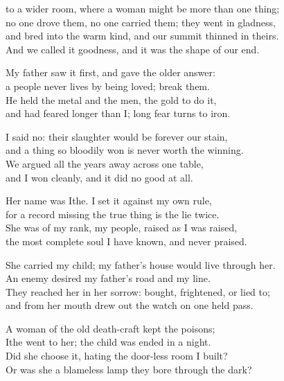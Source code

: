 \begin{founder}
to a wider room, where a woman might be more than one thing;\\
no one drove them, no one carried them; they went in gladness,\\
and bred into the warm kind, and our summit thinned in theirs.\\
And we called it goodness, and it was the shape of our end.\\

\ornament

My father saw it first, and gave the older answer:\\
a people never lives by being loved; break them.\\
He held the metal and the men, the gold to do it,\\
and had feared longer than I; long fear turns to iron.\\
\medskip

I said no: their slaughter would be forever our stain,\\
and a thing so bloodily won is never worth the winning.\\
We argued all the years away across one table,\\
and I won cleanly, and it did no good at all.\\
\medskip

Her name was Ithe. I set it against my own rule,\\
for a record missing the true thing is the lie twice.\\
She was of my rank, my people, raised as I was raised,\\
the most complete soul I have known, and never praised.\\
\medskip

She carried my child; my father's house would live through her.\\
An enemy desired my father's road and my line.\\
They reached her in her sorrow: bought, frightened, or lied to;\\
and from her mouth drew out the watch on one held pass.\\
\medskip

A woman of the old death-craft kept the poisons;\\
Ithe went to her; the child was ended in a night.\\
Did she choose it, hating the door-less room I built?\\
Or was she a blameless lamp they bore through the dark?\\
\medskip


\end{founder}
